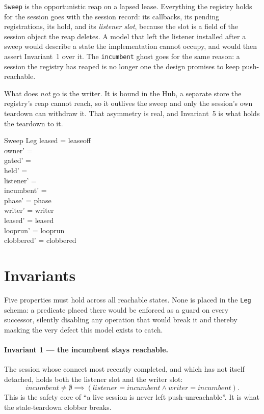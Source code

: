 \documentclass[a4paper,10pt,fleqn]{article}
\begin{document}
\texttt{Sweep} is the opportunistic reap on a lapsed lease.  Everything
the registry holds for the session goes with the session record: its
callbacks, its pending registrations, its hold, and its \emph{listener
slot}, because the slot is a field of the session object the reap
deletes.  A model that left the listener installed after a sweep would
describe a state the implementation cannot occupy, and would then assert
Invariant~1 over it.  The \texttt{incumbent} ghost goes for the same
reason: a session the registry has reaped is no longer one the design
promises to keep push-reachable.

What does \emph{not} go is the writer.  It is bound in the Hub, a
separate store the registry's reap cannot reach, so it outlives the
sweep and only the session's own teardown can withdraw it.  That
asymmetry is real, and Invariant~5 is what holds the teardown to it.

\begin{schema}{Sweep}
  \Delta Leg
\where
  leased = leaseoff \\
  owner' = \emptyset \\
  gated' = \emptyset \\
  held' = \emptyset \\
  listener' = \emptyset \\
  incumbent' = \emptyset \\
  phase' = phase \\
  writer' = writer \\
  leased' = leased \\
  looprun' = looprun \\
  clobbered' = clobbered
\end{schema}

\section{Invariants}
\label{sec:inv}

Five properties must hold across all reachable states.  None is placed
in the \texttt{Leg} schema: a predicate placed there would be enforced
as a guard on every successor, silently disabling any operation that
would break it and thereby masking the very defect this model exists to
catch.

\paragraph{Invariant 1 --- the incumbent stays reachable.}
The session whose connect most recently completed, and which has not
itself detached, holds both the listener slot and the writer slot:
\[
  incumbent \neq \emptyset
  \implies (listener = incumbent \land writer = incumbent).
\]
This is the safety core of ``a live session is never left
push-unreachable''.  It is what the stale-teardown clobber breaks.
\end{document}
